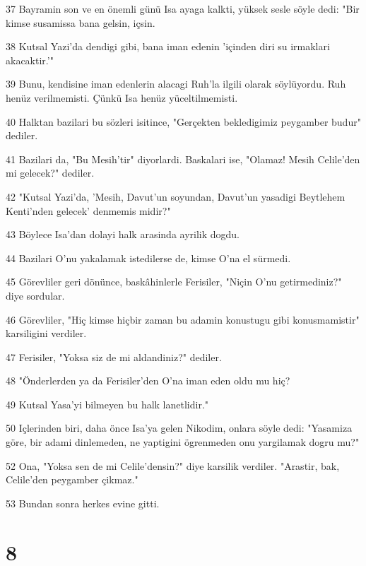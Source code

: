 \par 37 Bayramin son ve en önemli günü Isa ayaga kalkti, yüksek sesle söyle dedi: "Bir kimse susamissa bana gelsin, içsin.
\par 38 Kutsal Yazi'da dendigi gibi, bana iman edenin 'içinden diri su irmaklari akacaktir.'"
\par 39 Bunu, kendisine iman edenlerin alacagi Ruh'la ilgili olarak söylüyordu. Ruh henüz verilmemisti. Çünkü Isa henüz yüceltilmemisti.
\par 40 Halktan bazilari bu sözleri isitince, "Gerçekten bekledigimiz peygamber budur" dediler.
\par 41 Bazilari da, "Bu Mesih'tir" diyorlardi. Baskalari ise, "Olamaz! Mesih Celile'den mi gelecek?" dediler.
\par 42 "Kutsal Yazi'da, 'Mesih, Davut'un soyundan, Davut'un yasadigi Beytlehem Kenti'nden gelecek' denmemis midir?"
\par 43 Böylece Isa'dan dolayi halk arasinda ayrilik dogdu.
\par 44 Bazilari O'nu yakalamak istedilerse de, kimse O'na el sürmedi.
\par 45 Görevliler geri dönünce, baskâhinlerle Ferisiler, "Niçin O'nu getirmediniz?" diye sordular.
\par 46 Görevliler, "Hiç kimse hiçbir zaman bu adamin konustugu gibi konusmamistir" karsiligini verdiler.
\par 47 Ferisiler, "Yoksa siz de mi aldandiniz?" dediler.
\par 48 "Önderlerden ya da Ferisiler'den O'na iman eden oldu mu hiç?
\par 49 Kutsal Yasa'yi bilmeyen bu halk lanetlidir."
\par 50 Içlerinden biri, daha önce Isa'ya gelen Nikodim, onlara söyle dedi: "Yasamiza göre, bir adami dinlemeden, ne yaptigini ögrenmeden onu yargilamak dogru mu?"
\par 52 Ona, "Yoksa sen de mi Celile'densin?" diye karsilik verdiler. "Arastir, bak, Celile'den peygamber çikmaz."
\par 53 Bundan sonra herkes evine gitti.

\chapter{8}

